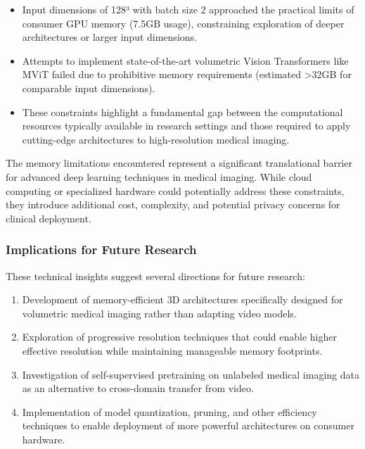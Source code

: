 \documentclass[12pt, a4paper]{article}
\begin{document}
\begin{itemize}
    \item Input dimensions of 128³ with batch size 2 approached the practical limits of consumer GPU memory (7.5GB usage), constraining exploration of deeper architectures or larger input dimensions.
    
    \item Attempts to implement state-of-the-art volumetric Vision Transformers like MViT failed due to prohibitive memory requirements (estimated >32GB for comparable input dimensions).
    
    \item These constraints highlight a fundamental gap between the computational resources typically available in research settings and those required to apply cutting-edge architectures to high-resolution medical imaging.
\end{itemize}

The memory limitations encountered represent a significant translational barrier for advanced deep learning techniques in medical imaging. While cloud computing or specialized hardware could potentially address these constraints, they introduce additional cost, complexity, and potential privacy concerns for clinical deployment.

\subsubsection{Implications for Future Research}

These technical insights suggest several directions for future research:

\begin{enumerate}
    \item Development of memory-efficient 3D architectures specifically designed for volumetric medical imaging rather than adapting video models.
    
    \item Exploration of progressive resolution techniques that could enable higher effective resolution while maintaining manageable memory footprints.
    
    \item Investigation of self-supervised pretraining on unlabeled medical imaging data as an alternative to cross-domain transfer from video.
    
    \item Implementation of model quantization, pruning, and other efficiency techniques to enable deployment of more powerful architectures on consumer hardware.
\end{enumerate}
\end{document}
